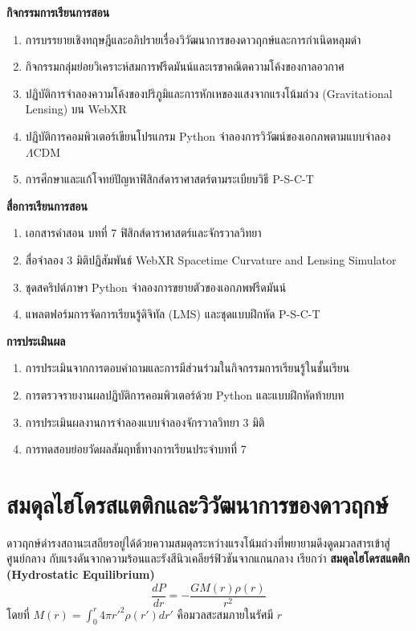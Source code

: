 \begin{lessonplanbox}
\noindent\textbf{กิจกรรมการเรียนการสอน}
\begin{enumerate}
    \item การบรรยายเชิงทฤษฎีและอภิปรายเรื่องวิวัฒนาการของดาวฤกษ์และการกำเนิดหลุมดำ
    \item กิจกรรมกลุ่มย่อยวิเคราะห์สมการฟรีดมันน์และเรขาคณิตความโค้งของกาลอวกาศ
    \item ปฏิบัติการจำลองความโค้งของปริภูมิและการหักเหของแสงจากแรงโน้มถ่วง (Gravitational Lensing) บน WebXR
    \item ปฏิบัติการคอมพิวเตอร์เขียนโปรแกรม Python จำลองการวิวัฒน์ของเอกภพตามแบบจำลอง $\Lambda\text{CDM}$
    \item การศึกษาและแก้โจทย์ปัญหาฟิสิกส์ดาราศาสตร์ตามระเบียบวิธี P-S-C-T
\end{enumerate}

\noindent\textbf{สื่อการเรียนการสอน}
\begin{enumerate}
    \item เอกสารคำสอน บทที่ 7 ฟิสิกส์ดาราศาสตร์และจักรวาลวิทยา
    \item สื่อจำลอง 3 มิติปฏิสัมพันธ์ WebXR Spacetime Curvature and Lensing Simulator
    \item ชุดสคริปต์ภาษา Python จำลองการขยายตัวของเอกภพฟรีดมันน์
    \item แพลตฟอร์มการจัดการเรียนรู้ดิจิทัล (LMS) และชุดแบบฝึกหัด P-S-C-T
\end{enumerate}

\noindent\textbf{การประเมินผล}
\begin{enumerate}
    \item การประเมินจากการตอบคำถามและการมีส่วนร่วมในกิจกรรมการเรียนรู้ในชั้นเรียน
    \item การตรวจรายงานผลปฏิบัติการคอมพิวเตอร์ด้วย Python และแบบฝึกหัดท้ายบท
    \item การประเมินผลงานการจำลองแบบจำลองจักรวาลวิทยา 3 มิติ
    \item การทดสอบย่อยวัดผลสัมฤทธิ์ทางการเรียนประจำบทที่ 7
\end{enumerate}
\end{lessonplanbox}
\newpage

\section{สมดุลไฮโดรสแตติกและวิวัฒนาการของดาวฤกษ์}

ดาวฤกษ์ดำรงสถานะเสถียรอยู่ได้ด้วยความสมดุลระหว่างแรงโน้มถ่วงที่พยายามดึงดูดมวลสารเข้าสู่ศูนย์กลาง กับแรงดันจากความร้อนและรังสีนิวเคลียร์ฟิวชันจากแกนกลาง เรียกว่า \textbf{สมดุลไฮโดรสแตติก (Hydrostatic Equilibrium)}
\begin{equation}
\frac{dP}{dr} = -\frac{G M(r) \rho(r)}{r^2}
\end{equation}
โดยที่ $M(r) = \int_0^r 4\pi {r'}^2 \rho(r') dr'$ คือมวลสะสมภายในรัศมี $r$

